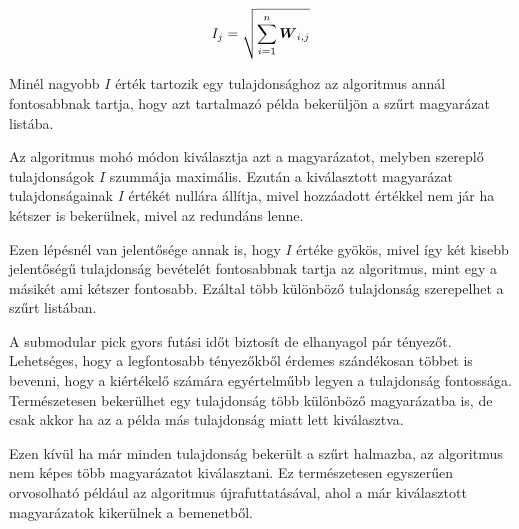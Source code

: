 \begin{equation}
    I_{j} = \sqrt{\sum_{i=1}^{n} \boldsymbol W_{i,j}}
\end{equation}

Minél nagyobb $I$ érték tartozik egy tulajdonsághoz az algoritmus annál fontosabbnak tartja, hogy azt tartalmazó példa bekerüljön a szűrt magyarázat listába.

Az algoritmus mohó módon kiválasztja azt a magyarázatot, melyben szereplő tulajdonságok $I$ szummája maximális. Ezután a kiválasztott magyarázat tulajdonságainak $I$ értékét nullára állítja, mivel hozzáadott értékkel nem jár ha kétszer is bekerülnek, mivel az redundáns lenne.

Ezen lépésnél van jelentősége annak is, hogy $I$ értéke gyökös, mivel így két kisebb jelentőségű tulajdonság bevételét fontosabbnak tartja az algoritmus, mint egy a másikét ami kétszer fontosabb. Ezáltal több különböző tulajdonság szerepelhet a szűrt listában.

A submodular pick gyors futási időt biztosít de elhanyagol pár tényezőt. Lehetséges, hogy a legfontosabb tényezőkből érdemes szándékosan többet is bevenni, hogy a kiértékelő számára egyértelműbb legyen a tulajdonság fontossága. Természetesen bekerülhet egy tulajdonság több különböző magyarázatba is, de csak akkor ha az a példa más tulajdonság miatt lett kiválasztva. 

Ezen kívül ha már minden tulajdonság bekerült a szűrt halmazba, az algoritmus nem képes több magyarázatot kiválasztani. Ez természetesen egyszerűen orvosolható például az algoritmus újrafuttatásával, ahol a már kiválasztott magyarázatok kikerülnek a bemenetből.

